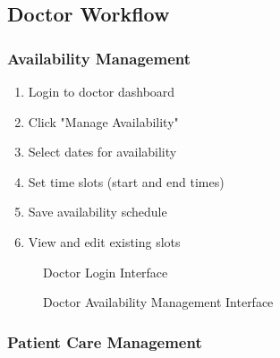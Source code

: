 \documentclass[12pt,a4paper]{article}
\begin{document}
\subsection{Doctor Workflow}

\subsubsection{Availability Management}

\begin{enumerate}
    \item Login to doctor dashboard
    \item Click "Manage Availability"
    \item Select dates for availability
    \item Set time slots (start and end times)
    \item Save availability schedule
    \item View and edit existing slots
\end{enumerate}

\begin{figure}[H]
\centering
{}
\caption{Doctor Login Interface}
\end{figure}

\begin{figure}[H]
\centering
{}
\caption{Doctor Availability Management Interface}
\end{figure}

\subsubsection{Patient Care Management}
\end{document}
